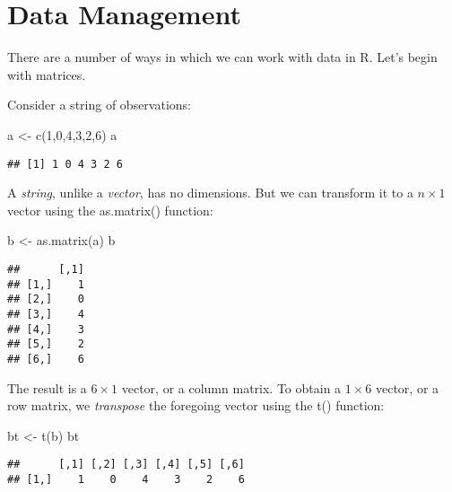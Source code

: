 \documentclass[
  oneside]{book}
\newenvironment{Shaded}{\begin{snugshade}}{\end{snugshade}}
\newcommand{\DecValTok}[1]{\textcolor[rgb]{0.00,0.00,0.81}{#1}}
\newcommand{\FunctionTok}[1]{\textcolor[rgb]{0.00,0.00,0.00}{#1}}
\newcommand{\NormalTok}[1]{#1}
\newcommand{\OtherTok}[1]{\textcolor[rgb]{0.56,0.35,0.01}{#1}}
\begin{document}
\hypertarget{data-management}{%
\section*{Data Management}\label{data-management}}

There are a number of ways in which we can work with data in R. Let's begin with matrices.

Consider a string of observations:

\begin{Shaded}
\begin{Highlighting}[]
\NormalTok{a }\OtherTok{\textless{}{-}} \FunctionTok{c}\NormalTok{(}\DecValTok{1}\NormalTok{,}\DecValTok{0}\NormalTok{,}\DecValTok{4}\NormalTok{,}\DecValTok{3}\NormalTok{,}\DecValTok{2}\NormalTok{,}\DecValTok{6}\NormalTok{)}
\NormalTok{a}
\end{Highlighting}
\end{Shaded}

\begin{verbatim}
## [1] 1 0 4 3 2 6
\end{verbatim}

A \emph{string}, unlike a \emph{vector}, has no dimensions. But we can transform it to a \(n \times 1\) vector using the as.matrix() function:

\begin{Shaded}
\begin{Highlighting}[]
\NormalTok{b }\OtherTok{\textless{}{-}} \FunctionTok{as.matrix}\NormalTok{(a)}
\NormalTok{b}
\end{Highlighting}
\end{Shaded}

\begin{verbatim}
##      [,1]
## [1,]    1
## [2,]    0
## [3,]    4
## [4,]    3
## [5,]    2
## [6,]    6
\end{verbatim}

The result is a \(6 \times 1\) vector, or a column matrix. To obtain a \(1 \times 6\) vector, or a row matrix, we \emph{transpose} the foregoing vector using the t() function:

\begin{Shaded}
\begin{Highlighting}[]
\NormalTok{bt }\OtherTok{\textless{}{-}} \FunctionTok{t}\NormalTok{(b)}
\NormalTok{bt}
\end{Highlighting}
\end{Shaded}

\begin{verbatim}
##      [,1] [,2] [,3] [,4] [,5] [,6]
## [1,]    1    0    4    3    2    6
\end{verbatim}
\end{document}
